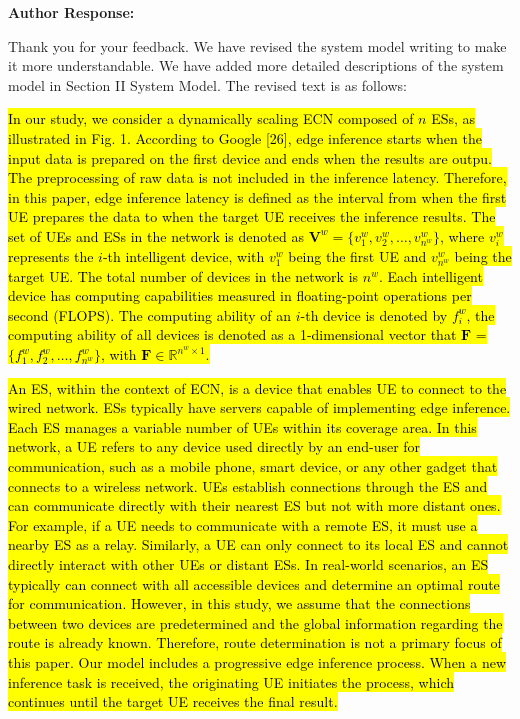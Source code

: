 \documentclass{ar2rc}
\newcommand{\highlight}[1]{\sethlcolor{yellow!50}\hl{#1}}
\begin{document}
\textbf{Author Response:} 

\noindent Thank you for your feedback. We have revised the system model writing to make it more understandable. We have added more detailed descriptions of the system model in Section II System Model. The revised text is as follows:

\highlight{In our study, we consider a dynamically scaling ECN composed of $n$ ESs, as illustrated in Fig. 1. According to Google [26], edge inference starts when the input data is prepared on the first device and ends when the results are outpu.  The preprocessing of raw data is not included in the inference latency. Therefore, in this paper, edge inference latency is defined as the interval from when the first UE prepares the data to when the target UE receives the inference results. The set of UEs and ESs in the network is denoted as $\mathbf{V}^{w} = \{v^{w}_1, v^{w}_2, \ldots, v^{w}_{n^w}\}$, where $v^{w}_i$ represents the $i$-th intelligent device, with $v_{1}^{w}$ being the first UE and $v^{w}_{n^w}$ being the target UE. The total number of devices in the network is $n^w$. Each intelligent device has computing capabilities measured in floating-point operations per second (FLOPS). The computing ability of an $i$-th device is denoted by $f^{w}_i$, the computing ability of all devices is denoted as a 1-dimensional vector that $\mathbf{F}$ = $\{f^{w}_1, f^{w}_2, \ldots, f^{w}_{n^w}\}$, with $\mathbf{F}$$\in$$\mathbb{R}^{n^w \times 1}$.}

\highlight{An ES, within the context of ECN, is a device that enables UE to connect to the wired network. ESs typically have servers capable of implementing edge inference. Each ES manages a variable number of UEs within its coverage area. In this network, a UE refers to any device used directly by an end-user for communication, such as a mobile phone, smart device, or any other gadget that connects to a wireless network. UEs establish connections through the ES and can communicate directly with their nearest ES but not with more distant ones. For example, if a UE needs to communicate with a remote ES, it must use a nearby ES as a relay. Similarly, a UE can only connect to its local ES and cannot directly interact with other UEs or distant ESs. In real-world scenarios, an ES typically can connect with all accessible devices and determine an optimal route for communication. However, in this study, we assume that the connections between two devices are predetermined and the global information regarding the route is already known. Therefore, route determination is not a primary focus of this paper. Our model includes a progressive edge inference process. When a new inference task is received, the originating UE initiates the process, which continues until the target UE receives the final result.}
\end{document}
